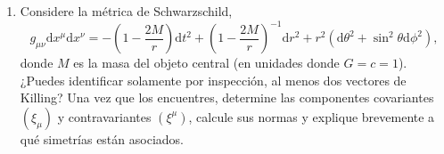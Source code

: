 \documentclass[../main]{subfiles}
\begin{document}
\begin{enumerate}
\begin{enumerate}[label=(\alph*)]
        \item Considere la métrica de Schwarzschild, 
        \begin{equation}
            g_{\mu\nu}\mathrm{d}x^{\mu}\mathrm{d}x^{\nu}=-\left(1-\dfrac{2M}{r}\right)\mathrm{d}t^2+\left(1-\dfrac{2M}{r}\right)^{-1}\mathrm{d}r^2+r^2(\mathrm{d}\theta^2+\sin^2 \theta \mathrm{d}\phi^2),
        \end{equation}
        donde $M$ es la masa del objeto central (en unidades donde $G=c=1$). ¿Puedes identificar solamente por inspección, al menos dos vectores de Killing? Una vez que los encuentres, determine las componentes covariantes $(\xi_{\mu})$ y contravariantes $(\xi^{\mu})$, calcule sus normas y explique brevemente a qué simetrías están asociados.
    \end{enumerate}
\end{enumerate}
\end{document}
